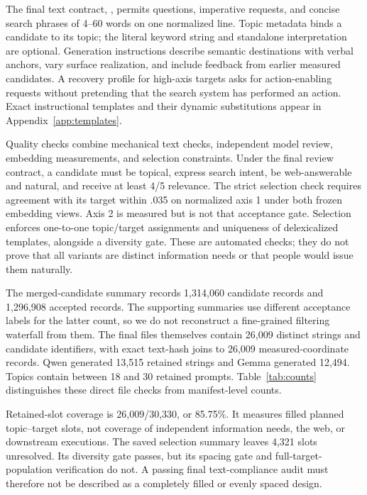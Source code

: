 The final text contract, , permits questions, imperative requests, and concise search phrases of 4--60 words on one normalized line. Topic metadata binds a candidate to its topic; the literal keyword string and standalone interpretation are optional. Generation instructions describe semantic destinations with verbal anchors, vary surface realization, and include feedback from earlier measured candidates. A recovery profile for high-axis targets asks for action-enabling requests without pretending that the search system has performed an action. Exact instructional templates and their dynamic substitutions appear in Appendix~\ref{app:templates}.

Quality checks combine mechanical text checks, independent model review, embedding measurements, and selection constraints. Under the final review contract, a candidate must be topical, express search intent, be web-answerable and natural, and receive at least 4/5 relevance. The strict selection check requires agreement with its target within .035 on normalized axis 1 under both frozen embedding views. Axis 2 is measured but is not that acceptance gate. Selection enforces one-to-one topic/target assignments and uniqueness of delexicalized templates, alongside a diversity gate. These are automated checks; they do not prove that all variants are distinct information needs or that people would issue them naturally.

The merged-candidate summary records 1,314,060 candidate records and 1,296,908 accepted records. The supporting summaries use different acceptance labels for the latter count, so we do not reconstruct a fine-grained filtering waterfall from them. The final files themselves contain 26,009 distinct strings and candidate identifiers, with exact text-hash joins to 26,009 measured-coordinate records. Qwen generated 13,515 retained strings and Gemma generated 12,494. Topics contain between 18 and 30 retained prompts. Table~\ref{tab:counts} distinguishes these direct file checks from manifest-level counts.

Retained-slot coverage is 26,009/30,330, or 85.75\%. It measures filled planned topic--target slots, not coverage of independent information needs, the web, or downstream executions. The saved selection summary leaves 4,321 slots unresolved. Its diversity gate passes, but its spacing gate and full-target-population verification do not. A passing final text-compliance audit must therefore not be described as a completely filled or evenly spaced design.

